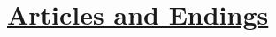 \documentclass[12pt]{article}
\begin{document}
\twocolumn

\section*{\underline{Articles and Endings}}
\end{document}
